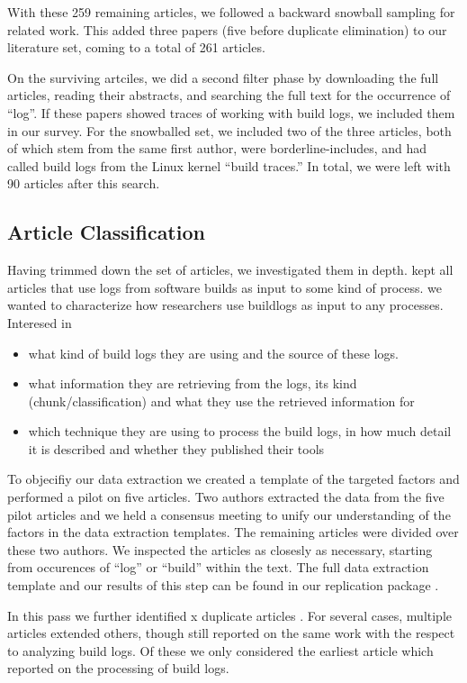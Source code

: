 With these 259 remaining articles, we followed a backward snowball
sampling for related work. This added three papers (five before
duplicate elimination) to our literature set, coming to a total of 261
articles. %

On the surviving artciles, we did a second filter phase by downloading the
full articles, reading their abstracts, and searching the full text
for the occurrence of ``log''. If these papers showed traces of
working with build logs, we included them in our survey. For the
snowballed set, we included two of the three articles, both of which
stem from the same first author, were borderline-includes, and had
called build logs from the Linux kernel ``build traces.'' In total, we
were left with 90 articles after this search.

\subsection{Article Classification}
Having trimmed down the set of articles, we investigated them in depth.
kept all articles that use logs from software builds as input to some kind of process.
we wanted to characterize how researchers use buildlogs as input to any processes.
Interesed in 
\begin{itemize}
  \item what kind of build logs they are using and the source of these logs.
  \item what information they are retrieving from the logs, 
  its kind (chunk/classification) and 
  what they use the retrieved information for
  \item which technique they are using to process the build logs,
  in how much detail it is described and whether they published their tools
\end{itemize}
To objecifiy our data extraction we created a template of the targeted factors
and performed a pilot on five articles. Two authors extracted the data from the
five pilot articles and we held a consensus meeting to unify our understanding
of the factors in the data extraction templates. The remaining articles were
divided over these two authors. We inspected the articles as closesly as necessary,
starting from occurences of ``log'' or ``build'' within the text.
The full data extraction template and our results of this step can be found in
our replication package .

In this pass we further identified x duplicate articles .
For several cases, multiple articles extended others, though still reported on
the same work with the respect to analyzing build logs.
Of these we only considered the earliest article which reported on the processing
of build logs.

